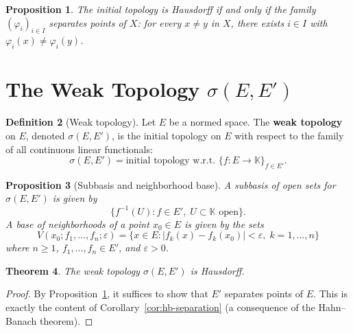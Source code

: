 \documentclass[a4paper,12pt]{book}
\newcommand{\K}{\mathbb{K}}
\theoremstyle{definition}
\newtheorem{definition}{Definition}[chapter]
\theoremstyle{plain}
\newtheorem{theorem}[definition]{Theorem}
\newtheorem{proposition}[definition]{Proposition}
\theoremstyle{remark}
\begin{document}
\begin{proposition}\label{prop:initial-hausdorff}
The initial topology is Hausdorff if and only if the family $(\varphi_i)_{i\in I}$
separates points of $X$: for every $x\ne y$ in $X$, there exists $i\in I$
with $\varphi_i(x)\ne\varphi_i(y)$.
\end{proposition}

\section{The Weak Topology \texorpdfstring{$\sigma(E,E')$}{sigma(E,E')}}%
\label{sec:weak-topology}

\begin{definition}[Weak topology]\label{def:weak-topology}
Let $E$ be a normed space.  The \textbf{weak topology} on $E$, denoted
$\sigma(E,E')$, is the initial topology on $E$ with respect to the family
of all continuous linear functionals:
\[
  \sigma(E,E') = \text{initial topology w.r.t.\ } \{f:E\to\K\}_{f\in E'}.
\]
\end{definition}

\begin{proposition}[Subbasis and neighborhood base]\label{prop:weak-nbhd}
A subbasis of open sets for $\sigma(E,E')$ is given by
\[
  \bigl\{f^{-1}(U) : f\in E',\; U\subset\K \text{ open}\bigr\}.
\]
A base of neighborhoods of a point $x_0\in E$ is given by the sets
\[
  V(x_0; f_1,\ldots,f_n;\varepsilon)
  = \bigl\{x\in E : |f_k(x)-f_k(x_0)| < \varepsilon,\; k=1,\ldots,n\bigr\}
\]
where $n\ge 1$, $f_1,\ldots,f_n\in E'$, and $\varepsilon>0$.
\end{proposition}

\begin{theorem}\label{thm:weak-hausdorff}
The weak topology $\sigma(E,E')$ is Hausdorff.
\end{theorem}

\begin{proof}
By Proposition~\ref{prop:initial-hausdorff}, it suffices to show that $E'$
separates points of $E$.  This is exactly the content of
Corollary~\ref{cor:hb-separation} (a consequence of the Hahn--Banach theorem).
\end{proof}
\end{document}
